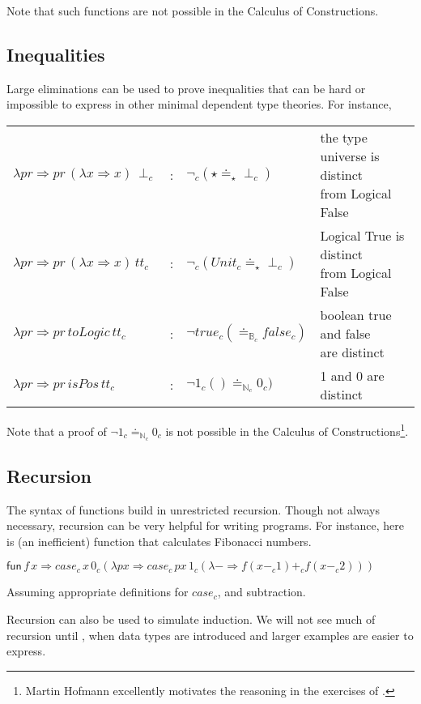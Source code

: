 Note that such functions are not possible in the Calculus of Constructions.

\subsection{Inequalities}

Large eliminations can be used to prove inequalities that can be hard or impossible to express in other minimal dependent type theories. %
For instance, 

\begin{tabular}{lcll}
  $\lambda pr\Rightarrow pr\,\left(\lambda x\Rightarrow x\right)\,\perp_{c}$ & : & $\lnot_{c}(\star\doteq_{\star}\perp_{c})$ & \makecell{the type universe is distinct\\ from Logical False}\tabularnewline
  $\lambda pr\Rightarrow pr\,\left(\lambda x\Rightarrow x\right)\,tt_{c}$ & : & $\lnot_{c}(Unit_{c}\doteq_{\star}\perp_{c})$ &  \makecell{Logical True is distinct\\ from Logical False}\tabularnewline
  $\lambda pr\Rightarrow pr\,toLogic\,tt_{c}$ & : & $\lnot true_{c}(\doteq_{\mathbb{B}_{c}}false_{c})$ &  \makecell{boolean true and false\\ are distinct}\tabularnewline
  $\lambda pr\Rightarrow pr\,isPos\,tt_{c}$ & : & $\lnot1_{c}()\doteq_{\mathbb{N}_{c}}0_{c})$ & 1 and 0 are distinct\tabularnewline
\end{tabular}
  


Note that a proof of $\lnot1_{c}\doteq_{\mathbb{N}_{c}}0_{c}$ is not possible in the Calculus of Constructions\cite{10.2307/2274575}\footnote{
  Martin Hofmann excellently motivates the reasoning in the exercises of \cite{hofmann_1997}.
}.

\subsection{Recursion}

The syntax of functions build in unrestricted recursion.
Though not always necessary, recursion can be very helpful for writing programs.
For instance, here is (an inefficient) function that calculates Fibonacci numbers.

$\mathsf{fun}\,f\,x\Rightarrow case_{c}\,x\,0_{c}\left(\lambda px\Rightarrow case_{c}\,px\,1_{c}\left(\lambda-\Rightarrow f\left(x-_{c}1\right)+_{c}f\left(x-_{c}2\right)\right)\right)$

Assuming appropriate definitions for $case_{c}$, and subtraction.

Recursion can also be used to simulate induction. 
We will not see much of recursion until , when data types are introduced and larger examples are easier to express.
